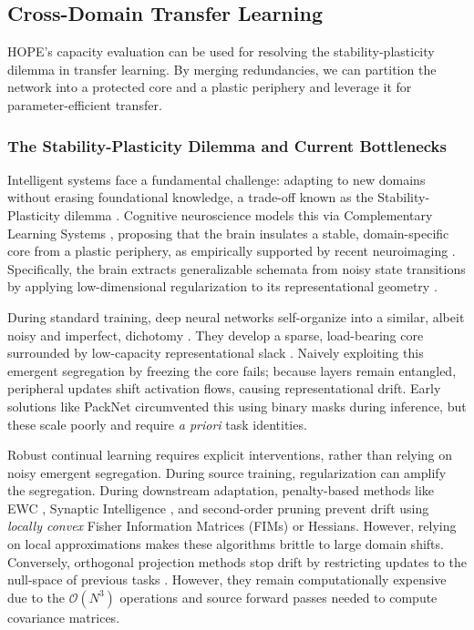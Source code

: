 \documentclass[11pt, a4paper, copyright, gdm]{google}
\newcommand{\calO}{\mathcal{O}}
\theoremstyle{definition}
\begin{document}
\subsection{Cross-Domain Transfer Learning}
\label{sec:deft_transfer}

HOPE’s capacity evaluation can be used for resolving the stability-plasticity dilemma in transfer learning. By merging redundancies, we can partition the network into a protected core and a plastic periphery and leverage it for parameter-efficient transfer.

\subsubsection{The Stability-Plasticity Dilemma and Current Bottlenecks}
Intelligent systems face a fundamental challenge: adapting to new domains without erasing foundational knowledge, a trade-off known as the Stability-Plasticity dilemma \cite{grossberg1987competitive}. Cognitive neuroscience models this via Complementary Learning Systems \cite{mcclelland1995why, kumaran2016what}, proposing that the brain insulates a stable, domain-specific core from a plastic periphery, as empirically supported by recent neuroimaging \cite{billot2024language, blank2016expanding, casto2026cerebellar}. Specifically, the brain extracts generalizable schemata from noisy state transitions by applying low-dimensional regularization to its representational geometry \cite{kimmel2026neural}.

During standard training, deep neural networks self-organize into a similar, albeit noisy and imperfect, dichotomy \cite{martin2017implicit}. They develop a sparse, load-bearing core surrounded by low-capacity representational slack \cite{frankle2019lottery, elcheairi2026theoretical}. Naively exploiting this emergent segregation by freezing the core fails; because layers remain entangled, peripheral updates shift activation flows, causing representational drift. Early solutions like PackNet \cite{mallya2018packnet} circumvented this using binary masks during inference, but these scale poorly and require \textit{a priori} task identities.

Robust continual learning requires explicit interventions, rather than relying on noisy emergent segregation. During source training, regularization \cite{wen2016learning, scardapane2017group} can amplify the segregation. During downstream adaptation, penalty-based methods like EWC \cite{kirkpatrick2017overcoming}, Synaptic Intelligence \cite{zenke2017continual}, and second-order pruning \cite{lecun1989optimal, hassibi1993optimal, singh2020woodfisher} prevent drift using \textit{locally convex} Fisher Information Matrices (FIMs) or Hessians. However, relying on local approximations makes these algorithms brittle to large domain shifts. Conversely, orthogonal projection methods stop drift by restricting updates to the null-space of previous tasks \cite{jaeger2014conceptors, saha2021gradient, zeng2019continuous, wang2021projecting, yang2025loranull, huggingface2026osf}. However, they remain computationally expensive due to the $\calO(N^3)$ operations and source forward passes needed to compute covariance matrices.
\end{document}
